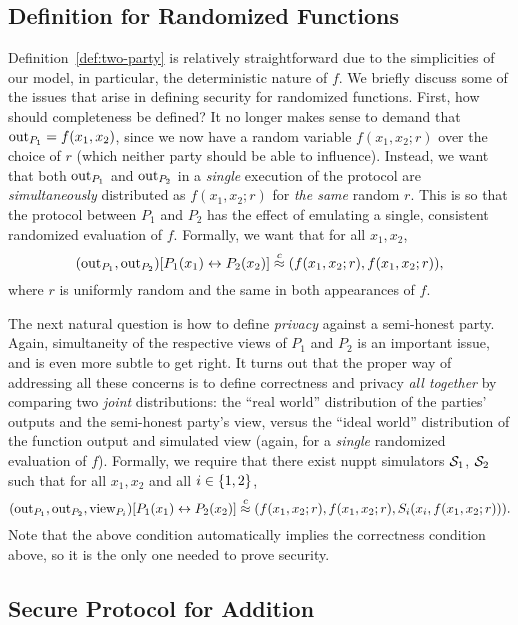 \documentclass[11pt]{article}
\begin{document}
\subsection{Definition for Randomized Functions}
\label{sec:defin-rand-funct}

Definition~\ref{def:two-party} is relatively straightforward due to
the simplicities of our model, in particular, the deterministic nature
of $f$.  We briefly discuss some of the issues that arise in defining
security for randomized functions.  First, how should completeness be
defined?  It no longer makes sense to demand that $\text{out}_{P_{1}} =
f(x_{1}, x_{2})$, since we now have a random variable $f(x_{1}, x_{2};
r)$ over the choice of $r$ (which neither party should be able to
influence).  Instead, we want that both $\text{out}_{P_{1}}$ and
$\text{out}_{P_{2}}$ in a \emph{single} execution of the protocol are
\emph{simultaneously} distributed as $f(x_{1}, x_{2}; r)$ for
\emph{the same} random $r$.  This is so that the protocol between
$P_{1}$ and $P_{2}$ has the effect of emulating a single, consistent
randomized evaluation of $f$.  Formally, we want that for all $x_{1},
x_{2}$, \[ (\text{out}_{P_{1}}, \text{out}_{P_{2}})[P_{1}(x_{1}) \leftrightarrow
P_{2}(x_{2})] \stackrel{c}{\approx} (f(x_{1}, x_{2}; r), f(x_{1}, x_{2}; r)), \]
where $r$ is uniformly random and the same in both appearances of $f$.

The next natural question is how to define \emph{privacy} against a
semi-honest party.  Again, simultaneity of the respective views of
$P_{1}$ and $P_{2}$ is an important issue, and is even more subtle to
get right.  It turns out that the proper way of addressing all these
concerns is to define correctness and privacy \emph{all together} by
comparing two \emph{joint} distributions: the ``real world''
distribution of the parties' outputs and the semi-honest party's view,
versus the ``ideal world'' distribution of the function output and
simulated view (again, for a \emph{single} randomized evaluation of
$f$).  Formally, we require that there exist nuppt simulators
$\mathcal{S}_{1}$, $\mathcal{S}_{2}$ such that for all $x_{1}, x_{2}$ and all $i \in
\{1,2\}$, \[ (\text{out}_{P_{1}}, \text{out}_{P_{2}},\text{view}_{P_i})[P_1(x_1)
\leftrightarrow P_2(x_2)] \stackrel{c}{\approx} (f(x_{1}, x_{2}; r),
f(x_1,x_2;r),S_i(x_i,f(x_1,x_2;r))). \] Note that the above condition
automatically implies the correctness condition above, so it is the
only one needed to prove security.

\subsection{Secure Protocol for Addition}
\label{sec:secure-prot-addit}
\end{document}
